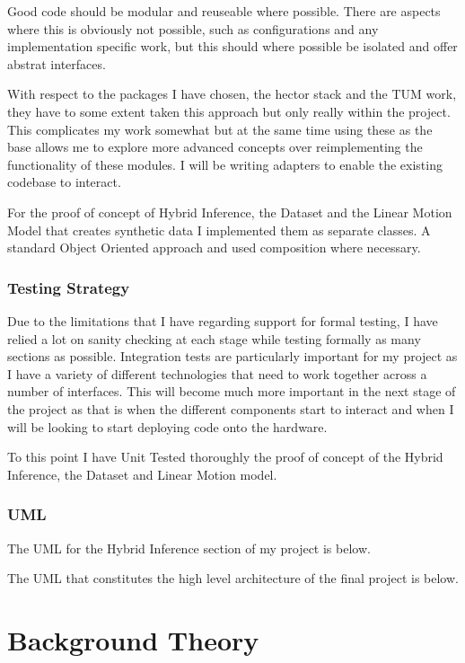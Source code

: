 \documentclass[]{../resources/final_report}
\begin{document}
Good code should be modular and reuseable where possible. There are aspects where this is obviously not possible, such as configurations and any implementation specific work, but this should where possible be isolated and offer abstrat interfaces.

With respect to the packages I have chosen, the hector stack and the TUM work, they have to some extent taken this approach but only really within the project. 
This complicates my work somewhat but at the same time using these as the base allows me to explore more advanced concepts over reimplementing the functionality of these modules.
I will be writing adapters to enable the existing codebase to interact.

For the proof of concept of Hybrid Inference, the Dataset and the Linear Motion Model that creates synthetic data I implemented them as separate classes. A standard Object Oriented approach and used composition where necessary.


\subsection{Testing Strategy}

Due to the limitations that I have regarding support for formal testing, I have relied a lot on sanity checking at each stage while testing formally as many sections as possible.
Integration tests are particularly important for my project as I have a variety of different technologies that need to work together across a number of interfaces.
This will become much more important in the next stage of the project as that is when the different components start to interact and when I will be looking to start deploying code onto the hardware.

To this point I have Unit Tested thoroughly the proof of concept of the Hybrid Inference, the Dataset and Linear Motion model.

\subsection{UML}
The UML for the Hybrid Inference section of my project is below.

The UML that constitutes the high level architecture of the final project is below.



\chapter{Background Theory}
\end{document}
